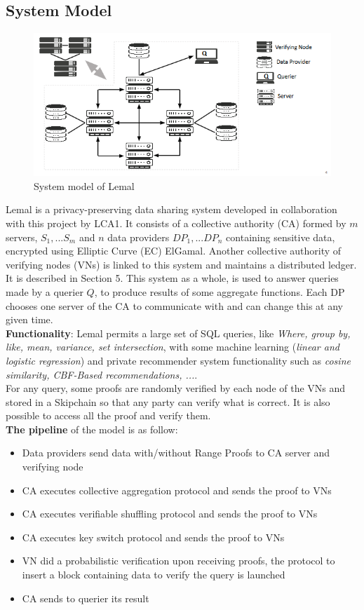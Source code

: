 \documentclass{article}
\begin{document}
\subsection{System Model}
\begin{figure}[H]
\center
\includegraphics[scale=0.75]{img/lemal.png}
\caption{System model of Lemal}
\end{figure}
Lemal is a privacy-preserving data sharing system developed in collaboration with this project by LCA1. It consists of a collective authority (CA) formed by $m$ servers, $S_1,...S_m$ and $n$ data providers $DP_1,...DP_n$ containing sensitive data, encrypted using Elliptic Curve (EC) ElGamal.
Another collective authority of verifying nodes (VNs) is linked to this system and maintains a distributed ledger. It is described in Section 5. This system as a whole, is used to answer queries made by a querier $Q$, to produce results of some aggregate functions. Each DP chooses one server of the CA to communicate with and can change this at any given time.\\
\textbf{Functionality}: Lemal permits a large set of SQL queries, like \textit{Where, group by, like, mean, variance, set intersection}, with some machine learning (\textit{linear and logistic regression}) and private recommender system functionality such as \textit{cosine similarity, CBF-Based recommendations, ...}.\\
For any query, some proofs are randomly verified by each node of the VNs and stored in a Skipchain so that any party can verify what is correct. It is also possible to access all the proof and verify them.\\
\textbf{The pipeline} of the model is as follow:
\begin{itemize}
\item{Data providers send data with/without Range Proofs to CA server and verifying node}
\item{CA executes collective aggregation protocol and sends the proof to VNs}
\item{CA executes verifiable shuffling protocol and sends the proof to VNs}
\item{CA executes key switch protocol and sends the proof to VNs}
\item{VN did a probabilistic verification upon receiving proofs, the protocol to insert a block containing data to verify the query is launched}
\item{CA sends to querier its result}
\end{itemize}
\end{document}

